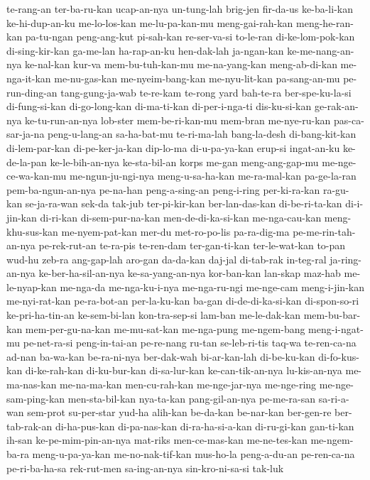 {te-rang-an ter-ba-ru-kan ucap-an-nya un-tung-lah brig-jen fir-da-us ke-ba-li-kan ke-hi-dup-an-ku
me-lo-los-kan me-lu-pa-kan-mu meng-gai-rah-kan meng-he-ran-kan pa-tu-ngan peng-ang-kut pi-sah-kan re-ser-va-si
to-le-ran di-ke-lom-pok-kan di-sing-kir-kan ga-me-lan ha-rap-an-ku hen-dak-lah ja-ngan-kan ke-me-nang-an-nya
ke-nal-kan kur-va mem-bu-tuh-kan-mu me-na-yang-kan meng-ab-di-kan me-nga-it-kan me-nu-gas-kan me-nyeim-bang-kan
me-nyu-lit-kan pa-sang-an-mu pe-run-ding-an tang-gung-ja-wab te-re-kam te-rong yard bah-te-ra
ber-spe-ku-la-si di-fung-si-kan di-go-long-kan di-ma-ti-kan di-per-i-nga-ti dis-ku-si-kan ge-rak-an-nya ke-tu-run-an-nya
lob-ster mem-be-ri-kan-mu mem-bran me-nye-ru-kan pas-ca-sar-ja-na peng-u-lang-an sa-ha-bat-mu te-ri-ma-lah
bang-la-desh di-bang-kit-kan di-lem-par-kan di-pe-ker-ja-kan dip-lo-ma di-u-pa-ya-kan erup-si ingat-an-ku
ke-de-la-pan ke-le-bih-an-nya ke-sta-bil-an korps me-gan meng-ang-gap-mu me-nge-ce-wa-kan-mu me-ngun-ju-ngi-nya
meng-u-sa-ha-kan me-ra-mal-kan pa-ge-la-ran pem-ba-ngun-an-nya pe-na-han peng-a-sing-an peng-i-ring per-ki-ra-kan
ra-gu-kan se-ja-ra-wan sek-da tak-jub ter-pi-kir-kan ber-lan-das-kan di-be-ri-ta-kan di-i-jin-kan
di-ri-kan di-sem-pur-na-kan men-de-di-ka-si-kan me-nga-cau-kan meng-khu-sus-kan me-nyem-pat-kan mer-du met-ro-po-lis
pa-ra-dig-ma pe-me-rin-tah-an-nya pe-rek-rut-an te-ra-pis te-ren-dam ter-gan-ti-kan ter-le-wat-kan to-pan
wud-hu zeb-ra ang-gap-lah aro-gan da-da-kan daj-jal di-tab-rak in-teg-ral
ja-ring-an-nya ke-ber-ha-sil-an-nya ke-sa-yang-an-nya kor-ban-kan lan-skap maz-hab me-le-nyap-kan me-nga-da
me-nga-ku-i-nya me-nga-ru-ngi me-nge-cam meng-i-jin-kan me-nyi-rat-kan pe-ra-bot-an per-la-ku-kan ba-gan
di-de-di-ka-si-kan di-spon-so-ri ke-pri-ha-tin-an ke-sem-bi-lan kon-tra-sep-si lam-ban me-le-dak-kan mem-bu-bar-kan
mem-per-gu-na-kan me-mu-sat-kan me-nga-pung me-ngem-bang meng-i-ngat-mu pe-net-ra-si peng-in-tai-an pe-re-nang
ru-tan se-leb-ri-tis taq-wa te-ren-ca-na ad-nan ba-wa-kan be-ra-ni-nya ber-dak-wah
bi-ar-kan-lah di-be-ku-kan di-fo-kus-kan di-ke-rah-kan di-ku-bur-kan di-sa-lur-kan ke-can-tik-an-nya lu-kis-an-nya
me-ma-nas-kan me-na-ma-kan men-cu-rah-kan me-nge-jar-nya me-nge-ring me-nge-sam-ping-kan men-sta-bil-kan nya-ta-kan
pang-gil-an-nya pe-me-ra-san sa-ri-a-wan sem-prot su-per-star yud-ha alih-kan be-da-kan
be-nar-kan ber-gen-re ber-tab-rak-an di-ha-pus-kan di-pa-nas-kan di-ra-ha-si-a-kan di-ru-gi-kan gan-ti-kan
ih-san ke-pe-mim-pin-an-nya mat-riks men-ce-mas-kan me-ne-tes-kan me-ngem-ba-ra meng-u-pa-ya-kan me-no-nak-tif-kan
mus-ho-la peng-a-du-an pe-ren-ca-na pe-ri-ba-ha-sa rek-rut-men sa-ing-an-nya sin-kro-ni-sa-si tak-luk
}
